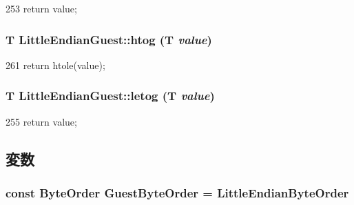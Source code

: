 \begin{DoxyCode}
253 {return value;}
\end{DoxyCode}
\hypertarget{namespaceLittleEndianGuest_a78d5c03420b8ee62e625df90ca9fa66d}{
\subsubsection[{htog}]{\setlength{\rightskip}{0pt plus 5cm}T LittleEndianGuest::htog (T {\em value})}}
\label{namespaceLittleEndianGuest_a78d5c03420b8ee62e625df90ca9fa66d}



\begin{DoxyCode}
261 {return htole(value);}
\end{DoxyCode}
\hypertarget{namespaceLittleEndianGuest_a2afbf7328c847d732303dc44c67c425d}{
\subsubsection[{letog}]{\setlength{\rightskip}{0pt plus 5cm}T LittleEndianGuest::letog (T {\em value})}}
\label{namespaceLittleEndianGuest_a2afbf7328c847d732303dc44c67c425d}



\begin{DoxyCode}
255 {return value;}
\end{DoxyCode}


\subsection{変数}
\hypertarget{namespaceLittleEndianGuest_aef5e34cb4383d2b11025693e07673656}{
\subsubsection[{GuestByteOrder}]{\setlength{\rightskip}{0pt plus 5cm}const {\bf ByteOrder} {\bf GuestByteOrder} = LittleEndianByteOrder}}
\label{namespaceLittleEndianGuest_aef5e34cb4383d2b11025693e07673656}
